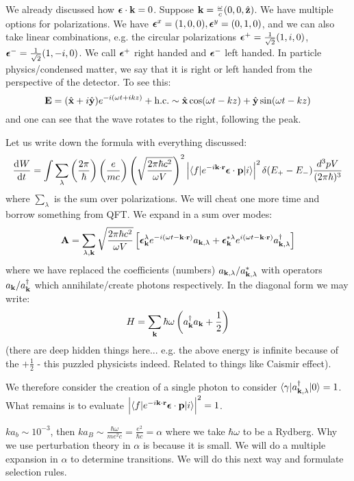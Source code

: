 We already discussed how $\mbox{\boldmath$ \epsilon $} \cdot \mathbf{k} = 0$. Suppose $\mathbf{k} = \frac{\omega}{c}(0, 0, \hat{\mathbf{z}})$. We have multiple options for polarizations. We have $\mbox{\boldmath$ \epsilon $}^x = (1, 0, 0), \mbox{\boldmath$ \epsilon $}^y = (0, 1, 0)$, and we can also take linear combinations, e.g. the circular polarizations $\mbox{\boldmath$ \epsilon $}^+ = \frac{1}{\sqrt{2}}(1, i, 0)$, $\mbox{\boldmath$ \epsilon $}^- = \frac{1}{\sqrt{2}}(1, -i, 0)$. We call $\mbox{\boldmath$ \epsilon $}^+$ right handed and $\mbox{\boldmath$ \epsilon $}^-$ left handed. In particle physics/condensed matter, we say that it is right or left handed from the perspective of the detector. To see this:
\begin{equation}
    \mathbf{E} = (\hat{\mathbf{x}} + i\hat{\mathbf{y}})e^{-i(\omega t + ikz)} + \text{h.c.} \sim \hat{\mathbf{x}}\cos(\omega t - kz) + \hat{\mathbf{y}}\sin(\omega t - kz)
\end{equation}
and one can see that the wave rotates to the right, following the peak.

Let us write down the formula with everything discussed:
\begin{equation}
    \dod{W}{t} = \int \sum_\lambda \left(\frac{2\pi}{\hbar}\right)\left(\frac{e}{mc}\right)\left(\sqrt{\frac{2\pi\hbar c^2}{\omega V}}\right)^2 \left|\bra{f}e^{-i\v{k} \cdot \v{r}}\gv{\e} \cdot \v{p}\ket{i}\right|^2\delta(E_+ - E_-)\frac{d^3pV}{(2\pi\hbar)^3}
\end{equation}
where $\sum_\lambda$ is the sum over polarizations. We will cheat one more time and borrow something from QFT. We expand in a sum over modes:
\begin{equation}
    \mathbf{A} = \sum_{\lambda, \mathbf{k}}\sqrt{\frac{2\pi\hbar c^2}{\omega V}}\left[\mbox{\boldmath$ \epsilon $}_{\mathbf{k}}^\lambda e^{-i(\omega t - \mathbf{k} \cdot \mathbf{r})}a_{\mathbf{k}, \lambda} + \mbox{\boldmath$ \epsilon $}^{*\lambda}_{\mathbf{k}}e^{i(\omega t - \mathbf{k} \cdot \mathbf{r})}a^\dagger_{\mathbf{k}, \lambda}\right]
\end{equation}
where we have replaced the coefficients (numbers) $a_{\mathbf{k, \lambda}}/a^*_{\mathbf{k, \lambda}}$ with operators $a_{\mathbf{k}}/a^\dagger_{\mathbf{k}}$ which annihilate/create photons respectively. In the diagonal form we may write:
\begin{equation}
    H = \sum_{\mathbf{k}}\hbar\omega \left(a^\dagger_{\mathbf{k}}a_{\mathbf{k}} + \frac{1}{2}\right)
\end{equation}
(there are deep hidden things here... e.g. the above energy is infinite because of the $+\frac{1}{2}$ - this puzzled physicists indeed. Related to things like Caismir effect).

We therefore consider the creation of a single photon to consider $\langle \gamma \rvert a^\dagger_{\mathbf{k}, \lambda}\lvert 0 \rangle = 1$. What remains is to evaluate $\left|\langle f \rvert e^{-i\mathbf{k} \cdot \mathbf{r}}\mbox{\boldmath$ \epsilon $} \cdot \mathbf{p}\lvert i \rangle\right|^2 = 1$. 

$ka_b \sim 10^{-3}$, then $ka_B \sim \frac{\hbar\omega}{me^2c} = \frac{e^2}{\hbar c} = \alpha$ where we take $\hbar\omega$ to be a Rydberg. Why we use perturbation theory in $\alpha$ is because it is small. We will do a multiple expansion in $\alpha$ to determine transitions. We will do this next way and formulate selection rules.